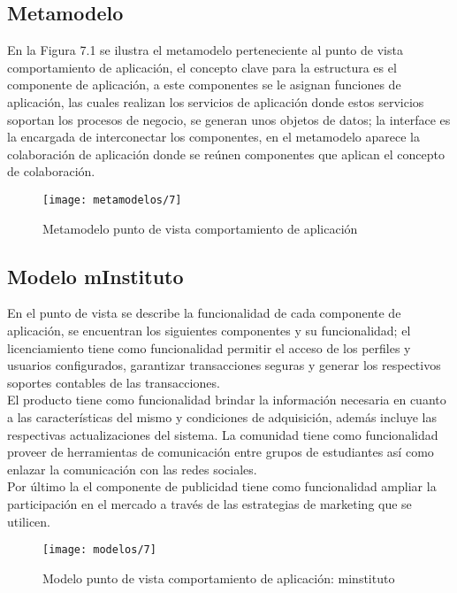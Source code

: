 \subsection{Metamodelo}
En la Figura 7.1 se ilustra el metamodelo perteneciente al punto de vista comportamiento de aplicación, el concepto clave para la estructura es el componente de aplicación, a este componentes se le asignan funciones de aplicación, las cuales realizan los servicios de aplicación donde estos servicios soportan los procesos de negocio, se generan unos objetos de datos; la interface es la encargada de interconectar los componentes, en el metamodelo aparece la colaboración de aplicación donde se reúnen componentes que aplican el concepto
de colaboración.

\begin{figure}[H]
	\centering
	\texttt{[image: metamodelos/7]}
	\captionsetup{width=.95\textwidth}
	\caption{Metamodelo punto de vista comportamiento de aplicación}
	\label{metamodelo7}
\end{figure}

  \subsection{Modelo mInstituto}
  En el punto de vista se describe la funcionalidad de cada componente de aplicación, se encuentran los siguientes componentes y su funcionalidad; el licenciamiento tiene como funcionalidad permitir el acceso de los perfiles y usuarios configurados, garantizar transacciones seguras y generar los respectivos soportes contables de las transacciones. \\
  
  El producto tiene como funcionalidad brindar la información necesaria en cuanto a las características del mismo y condiciones de adquisición, además incluye las respectivas actualizaciones del sistema. La comunidad tiene como funcionalidad proveer de herramientas de comunicación entre grupos de estudiantes así como enlazar la comunicación con las redes sociales. \\
  
  Por último la el componente de publicidad tiene como funcionalidad ampliar la participación en el mercado a través de las estrategias de marketing que se utilicen.

\begin{figure}[H]
	\centering
	\texttt{[image: modelos/7]}
	\captionsetup{width=.95\textwidth}
	\caption{Modelo punto de vista comportamiento de aplicación: minstituto}
	\label{modelo7}
\end{figure}

